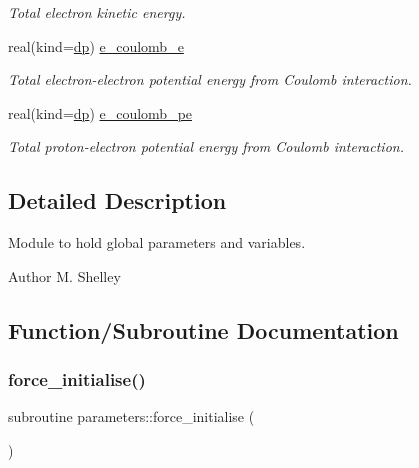\begin{DoxyCompactItemize}
\begin{DoxyCompactList}\small\item\em Total electron kinetic energy. \end{DoxyCompactList}\item 
real(kind=\mbox{\hyperlink{namespaceparameters_a52f8c6351fd79345d8811e065bcbbb37}{dp}}) \mbox{\hyperlink{group__ELECTRONS_gae8693f5e86170e1a2d3e4a4f7dc81c37}{e\+\_\+coulomb\+\_\+e}}
\begin{DoxyCompactList}\small\item\em Total electron-\/electron potential energy from Coulomb interaction. \end{DoxyCompactList}\item 
real(kind=\mbox{\hyperlink{namespaceparameters_a52f8c6351fd79345d8811e065bcbbb37}{dp}}) \mbox{\hyperlink{group__ELECTRONS_ga62c8de947854059418c7f8c8e5cd9458}{e\+\_\+coulomb\+\_\+pe}}
\begin{DoxyCompactList}\small\item\em Total proton-\/electron potential energy from Coulomb interaction. \end{DoxyCompactList}\end{DoxyCompactItemize}


\subsection{Detailed Description}
Module to hold global parameters and variables. 

\begin{DoxyAuthor}{Author}
M. Shelley 
\end{DoxyAuthor}


\subsection{Function/\+Subroutine Documentation}
\mbox{\label{namespaceparameters_a55242f635842d12dbb53d66ae9248b93}} 
\subsubsection{\texorpdfstring{force\+\_\+initialise()}{force\_initialise()}}
{\footnotesize\ttfamily subroutine parameters\+::force\+\_\+initialise (\begin{DoxyParamCaption}{ }\end{DoxyParamCaption})}



